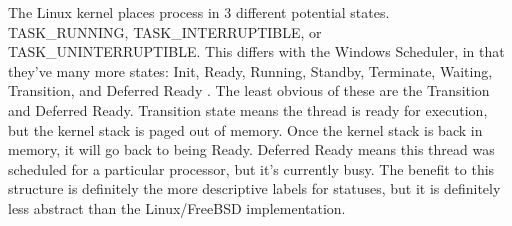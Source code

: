 \documentclass[10pt,draftclsnofoot,onecolumn]{IEEEtran}
\begin{document}
\par The Linux kernel places process in 3 different potential states. TASK\_RUNNING, TASK\_INTERRUPTIBLE, or TASK\_UNINTERRUPTIBLE.
This differs with the Windows Scheduler, in that they've many more states: Init, Ready, Running, Standby, Terminate, Waiting, Transition, and Deferred Ready \cite{win:1}.
The least obvious of these are the Transition and Deferred Ready.
Transition state means the thread is ready for execution, but the kernel stack is paged out of memory.
Once the kernel stack is back in memory, it will go back to being Ready.
Deferred Ready means this thread was scheduled for a particular processor, but it's currently busy.
The benefit to this structure is definitely the more descriptive labels for statuses, but it is definitely less abstract than the Linux/FreeBSD implementation.




\end{document}
